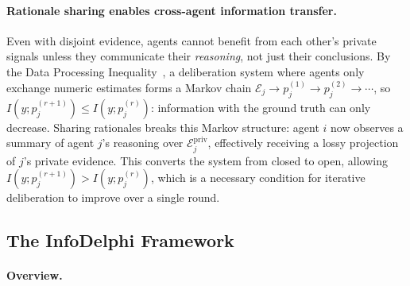 \documentclass[11pt]{article}
\theoremstyle{plain}
\theoremstyle{definition}
\newtheorem{definition}{Definition}[section]
\newcommand{\Epriv}[1]{\mathcal{E}_{#1}^{\mathrm{priv}}}
\begin{document}

\paragraph{Rationale sharing enables cross-agent information transfer.}
Even with disjoint evidence, agents cannot benefit from each other's private signals unless they communicate their \textit{reasoning}, not just their conclusions.
By the Data Processing Inequality~\citep{shin2026reasoning}, a deliberation system where agents only exchange numeric estimates forms a Markov chain $\mathcal{E}_j \to p_j^{(1)} \to p_j^{(2)} \to \cdots$, so $I(y; p_j^{(r+1)}) \leq I(y; p_j^{(r)})$: information with the ground truth can only decrease.
Sharing rationales breaks this Markov structure: agent $i$ now observes a summary of agent $j$'s reasoning over $\Epriv{j}$, effectively receiving a lossy projection of $j$'s private evidence.
This converts the system from closed to open, allowing $I(y; p_j^{(r+1)}) > I(y; p_j^{(r)})$, which is a necessary condition for iterative deliberation to improve over a single round.






\subsection{The InfoDelphi Framework}

\paragraph{Overview.}
\end{document}
